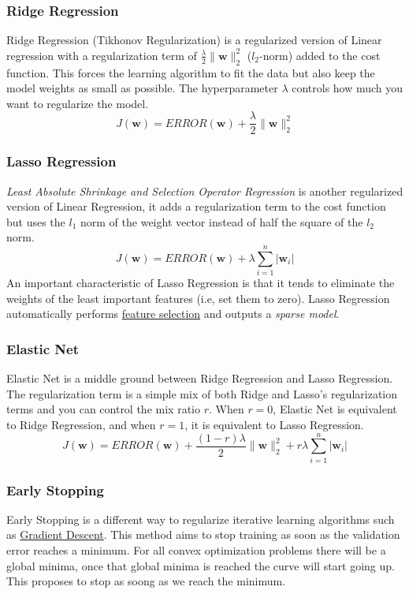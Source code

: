 \documentclass[12pt]{article}
\begin{document}
        \subsubsection{Ridge Regression} \label{sec:RidgeReg} Ridge Regression (Tikhonov Regularization) is a
            regularized version of Linear regression with a regularization term of
            $\frac{\lambda}{2}\|\boldsymbol{w}\|_2^2$ ($l_2$-norm) added to the cost function. This forces the learning
            algorithm to fit the data but also keep the model weights as small as possible. The hyperparameter $\lambda$
            controls how much you want to regularize the model.
            $$ J(\boldsymbol{w}) = ERROR(\boldsymbol{w}) + \frac{\lambda}{2}\|\boldsymbol{w}\|^2_2 $$

        \subsubsection{Lasso Regression}
            \textit{Least Absolute Shrinkage and Selection Operator Regression} is another regularized version of Linear
            Regression, it adds a regularization term to the cost function but uses the $l_1$ norm of the weight vector
            instead of half the square of the $l_2$ norm.
            $$ J(\boldsymbol{w}) = ERROR(\boldsymbol{w}) + \lambda\sum_{i=1}^n|\boldsymbol{w}_i| $$ An important
            characteristic of Lasso Regression is that it tends to eliminate the weights of the least important features
            (i.e, set them to zero). Lasso Regression automatically performs \hyperref[sec:FeatureSelection]{feature
            selection} and outputs a \textit{sparse model}.

        \subsubsection{Elastic Net}
            Elastic Net is a middle ground between Ridge Regression and Lasso Regression. The regularization term is a
            simple mix of both Ridge and Lasso's regularization terms and you can control the mix ratio $r$. When $r =
            0$, Elastic Net is equivalent to Ridge Regression, and when $r = 1$, it is equivalent to Lasso Regression.
            $$ J(\boldsymbol{w}) = ERROR(\boldsymbol{w}) + \frac{(1-r)\lambda}{2}\|\boldsymbol{w}\|^2_2 +
            r\lambda\sum_{i=1}^n|\boldsymbol{w}_i| $$
        
        \subsubsection{Early Stopping}
            Early Stopping is a different way to regularize iterative learning algorithms such as
            \hyperref[sec:GD]{Gradient Descent}. This method aims to stop training as soon as the validation error
            reaches a minimum. For all convex optimization problems there will be a global minima, once that global
            minima is reached the curve will start going up. This proposes to stop as soong as we reach the minimum.
        
\printindex
\end{document}
